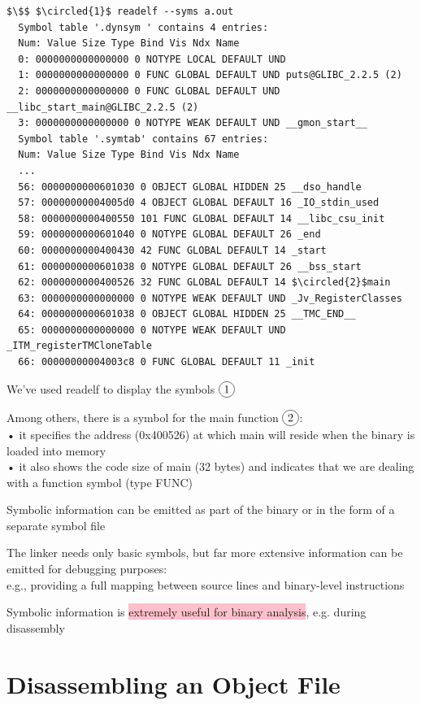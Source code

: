 \documentclass[]{project_plan}
\newcommand*\circled[1]{\tikz[baseline=(char.base)]{
            \node[shape=circle,draw,inner sep=2pt] (char) {#1};}}
\begin{document}
\begin{lstlisting}[mathescape]
  $\$$ $\circled{1}$ readelf --syms a.out
  Symbol table '.dynsym ' contains 4 entries:
  Num: Value Size Type Bind Vis Ndx Name
  0: 0000000000000000 0 NOTYPE LOCAL DEFAULT UND
  1: 0000000000000000 0 FUNC GLOBAL DEFAULT UND puts@GLIBC_2.2.5 (2)
  2: 0000000000000000 0 FUNC GLOBAL DEFAULT UND __libc_start_main@GLIBC_2.2.5 (2)
  3: 0000000000000000 0 NOTYPE WEAK DEFAULT UND __gmon_start__
  Symbol table '.symtab' contains 67 entries:
  Num: Value Size Type Bind Vis Ndx Name
  ...
  56: 0000000000601030 0 OBJECT GLOBAL HIDDEN 25 __dso_handle
  57: 00000000004005d0 4 OBJECT GLOBAL DEFAULT 16 _IO_stdin_used
  58: 0000000000400550 101 FUNC GLOBAL DEFAULT 14 __libc_csu_init
  59: 0000000000601040 0 NOTYPE GLOBAL DEFAULT 26 _end
  60: 0000000000400430 42 FUNC GLOBAL DEFAULT 14 _start
  61: 0000000000601038 0 NOTYPE GLOBAL DEFAULT 26 __bss_start
  62: 0000000000400526 32 FUNC GLOBAL DEFAULT 14 $\circled{2}$main
  63: 0000000000000000 0 NOTYPE WEAK DEFAULT UND _Jv_RegisterClasses
  64: 0000000000601038 0 OBJECT GLOBAL HIDDEN 25 __TMC_END__
  65: 0000000000000000 0 NOTYPE WEAK DEFAULT UND _ITM_registerTMCloneTable
  66: 00000000004003c8 0 FUNC GLOBAL DEFAULT 11 _init
\end{lstlisting}

We’ve used readelf to display the symbols $\circled{1}$

Among others, there is a symbol for the main function $\circled{2}$:\\
• it specifies the address (0x400526) at which main will reside when the binary is loaded into memory\\
• it also shows the code size of main (32 bytes) and indicates that we are
dealing with a function symbol (type FUNC)

Symbolic information can be emitted as part of the binary or in the form of
a separate symbol file

The linker needs only basic symbols, but far more extensive information can
be emitted for debugging purposes:\\
e.g., providing a full mapping between source lines and binary-level
instructions

Symbolic information is \colorbox{pink}{extremely useful for binary analysis}, e.g. during
disassembly

\section{Disassembling an Object File}
\end{document}
